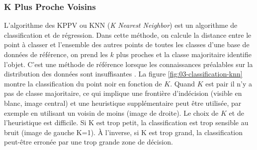 \documentclass[../thesis.tex]{subfiles}
\begin{document}
    \subsubsection{K Plus Proche Voisins} L'algorithme des KPPV ou KNN (\textit{K Nearest Neighbor}) est un algorithme de classification et de régression. Dans cette méthode, on calcule la distance entre le point à classer et l'ensemble des autres points de toutes les classes d'une base de données de référence, on prend les $k$ plus proches et la classe majoritaire identifie l'objet. C'est une méthode de référence lorsque les connaissances préalables sur la distribution des données sont insuffisantes \cite{peterson2009k}. La figure \ref{fig:03-classification-knn} montre la classification du point noir en fonction de $K$. Quand $K$ est pair il n'y a pas de classe majoritaire, ce qui implique une frontière d'indécision (visible en blanc, image central) et une heuristique supplémentaire peut être utilisée, par exemple en utilisant un voisin de moins (image de droite). Le choix de $K$ et de l'heuristique est difficile. Si K est trop petit, la classification est trop sensible au bruit (image de gauche K=1). À l'inverse, si K est trop grand, la classification peut-être erronée par une trop grande zone de décision.
    
\end{document}
